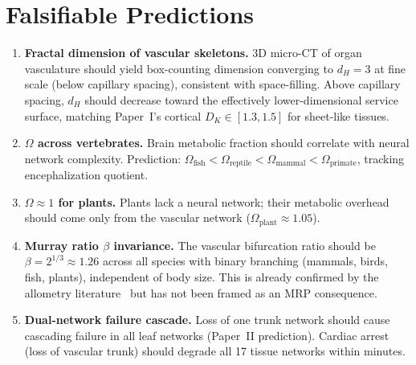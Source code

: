 \documentclass[aps,pre,twocolumn,superscriptaddress,longbibliography]{revtex4-2}
\begin{document}
\section{Falsifiable Predictions}
\label{sec:predictions}

\begin{enumerate}
  \item \textbf{Fractal dimension of vascular skeletons.}
    3D micro-CT of organ vasculature should yield
    box-counting dimension converging to $d_H = 3$ at
    fine scale (below capillary spacing), consistent with
    space-filling.
    Above capillary spacing, $d_H$ should decrease toward
    the effectively lower-dimensional service surface,
    matching Paper~I's cortical $D_K \in [1.3, 1.5]$ for
    sheet-like tissues.

  \item \textbf{$\Omega$ across vertebrates.}
    Brain metabolic fraction should correlate with
    neural network complexity.
    Prediction: $\Omega_{\text{fish}} <
    \Omega_{\text{reptile}} < \Omega_{\text{mammal}} <
    \Omega_{\text{primate}}$, tracking encephalization
    quotient.

  \item \textbf{$\Omega \approx 1$ for plants.}
    Plants lack a neural network; their metabolic overhead
    should come only from the vascular network
    ($\Omega_{\text{plant}} \approx 1.05$).

  \item \textbf{Murray ratio $\beta$ invariance.}
    The vascular bifurcation ratio should be $\beta =
    2^{1/3} \approx 1.26$ across all species with binary
    branching (mammals, birds, fish, plants), independent
    of body size.  This is already confirmed by the
    allometry literature~\cite{WBE1997} but has not
    been framed as an MRP consequence.

  \item \textbf{Dual-network failure cascade.}
    Loss of one trunk network should cause cascading
    failure in all leaf networks (Paper~II prediction).
    Cardiac arrest (loss of vascular trunk) should
    degrade all 17 tissue networks within minutes.


\end{enumerate}
\end{document}
